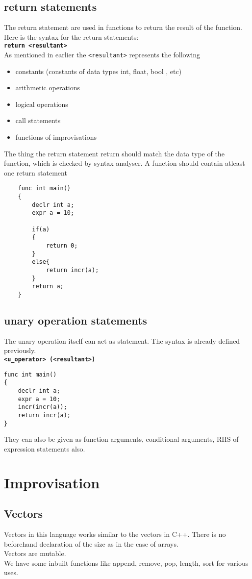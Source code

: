 \documentclass[journal, 18pt]{report}
\begin{document}
\section{return statements}
The return statement are used in functions to return the result of the function. Here is the syntax for the return statements:\\
\textbf{\texttt{return <resultant>}}\\
As mentioned in earlier the \texttt{<resultant>} represents the following
\begin{itemize}
    \item constants (constants of data types int, float, bool , etc)
    \item arithmetic operations
    \item logical operations
    \item call statements
    \item functions of improvisations
\end{itemize}
The thing the return statement return should match the data type of the function, which is checked by syntax analyser. A function should contain atleast one return statement
\begin{lstlisting}
    func int main()
    {
        declr int a;
        expr a = 10;
        
        if(a)
        {
            return 0;
        }
        else{
            return incr(a);
        }
        return a;
    }
\end{lstlisting}
\section{unary operation statements}
The unary operation itself can act as statement. The syntax is already defined previously.\\
\textbf{\texttt{<u\_operator> (<resultant>)}}
\begin{lstlisting}
func int main()
{
    declr int a;
    expr a = 10;
    incr(incr(a));
    return incr(a);
}
\end{lstlisting}
They can also be given as function arguments, conditional arguments, RHS of expression statements also.
\chapter{Improvisation}

\section{Vectors}
Vectors in this language works similar to the vectors in C++. There is no beforehand declaration of the size as in the case of arrays.\\
Vectors are mutable.\\
We have some inbuilt functions like append, remove, pop, length, sort for various uses.
\end{document}
